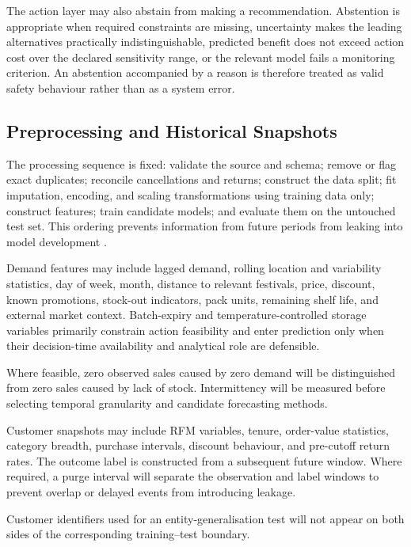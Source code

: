 \documentclass[a4paper,11pt,oneside]{book}
\theoremstyle{plain}
\theoremstyle{definition}
\theoremstyle{remark}
\begin{document}
The action layer may also abstain from making a recommendation. Abstention is
appropriate when required constraints are missing, uncertainty makes the leading
alternatives practically indistinguishable, predicted benefit does not exceed
action cost over the declared sensitivity range, or the relevant model fails a
monitoring criterion. An abstention accompanied by a reason is therefore treated as
valid safety behaviour rather than as a system error.


\subsection{Preprocessing and Historical Snapshots}
\label{subsec:preprocessing_snapshots}

The processing sequence is fixed: validate the source and schema; remove or flag
exact duplicates; reconcile cancellations and returns; construct the data split;
fit imputation, encoding, and scaling transformations using training data only;
construct features; train candidate models; and evaluate them on the untouched
test set. This ordering prevents information from future periods from leaking
into model development \cite{kaufman2012leakage}.

Demand features may include lagged demand, rolling location and variability
statistics, day of week, month, distance to relevant festivals, price,
discount, known promotions, stock-out indicators, pack units, remaining shelf
life, and external market context. Batch-expiry and temperature-controlled storage variables
primarily constrain action feasibility and enter prediction only when their
decision-time availability and analytical role are defensible.

Where feasible, zero observed sales caused by zero demand will be distinguished
from zero sales caused by lack of stock. Intermittency will be measured before
selecting temporal granularity and candidate forecasting methods.

Customer snapshots may include RFM variables, tenure, order-value statistics,
category breadth, purchase intervals, discount behaviour, and pre-cutoff return
rates. The outcome label is constructed from a subsequent future window. Where
required, a purge interval will separate the observation and label windows to
prevent overlap or delayed events from introducing leakage.

Customer identifiers used for an entity-generalisation test will not appear on
both sides of the corresponding training--test boundary.
\end{document}
